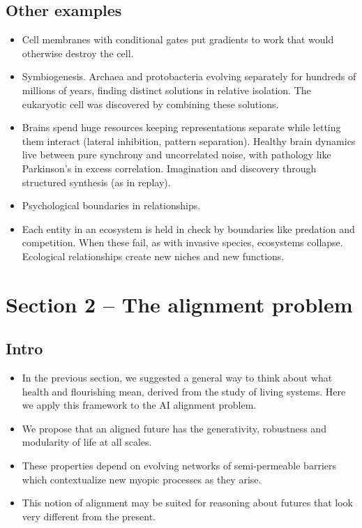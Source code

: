 \documentclass[11pt]{article}
\begin{document}
\subsection*{Other examples}

\begin{itemize}
  \item Cell membranes with conditional gates put gradients to work that would otherwise destroy the cell.
  \item Symbiogenesis. Archaea and protobacteria evolving separately for hundreds of millions of years, finding distinct solutions in relative isolation. The eukaryotic cell was discovered by combining these solutions.
  \item Brains spend huge resources keeping representations separate while letting them interact (lateral inhibition, pattern separation). Healthy brain dynamics live between pure synchrony and uncorrelated noise, with pathology like Parkinson's in excess correlation. Imagination and discovery through structured synthesis (as in replay). 
  \item Psychological boundaries in relationships. 
  \item Each entity in an ecosystem is held in check by boundaries like predation and competition. When these fail, as with invasive species, ecosystems collapse. Ecological relationships create new niches and new functions.
\end{itemize}

\section*{Section 2 -- The alignment problem}

\subsection*{Intro}

\begin{itemize}
  \item In the previous section, we suggested a general way to think about what health and flourishing mean, derived from the study of living systems. Here we apply this framework to the AI alignment problem. 
  \item We propose that an aligned future has the generativity, robustness and modularity of life at all scales. 
  \item These properties depend on evolving networks of semi-permeable barriers which contextualize new myopic processes as they arise.
  \item This notion of alignment may be suited for reasoning about futures that look very different from the present.
\end{itemize}
\end{document}
